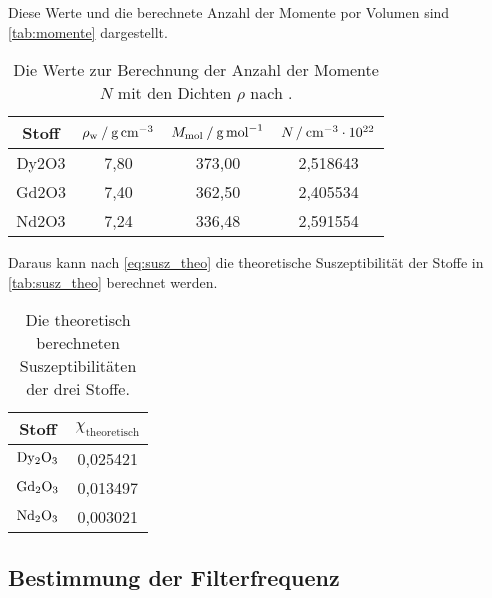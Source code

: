 Diese Werte und die berechnete Anzahl der Momente por Volumen sind \autoref{tab:momente} dargestellt.
\begin{table}
  \centering
  \caption{Die Werte zur Berechnung der Anzahl der Momente $N$ mit den Dichten $\rho$ nach \cite{v606}.}
  \label{tab:momente}
  \begin{tabular}{c c c c}
    \toprule
    Stoff &     
    $\rho_\text{w} \mathbin{/} \unit[per-mode=reciprocal]{\gram\per\cubic\centi\meter}$ & 
    $M_\text{mol} \mathbin{/} \unit[per-mode=reciprocal]{\gram\per\mol}$ & 
    $N \mathbin{/} \unit[per-mode=reciprocal]{\per\cubic\centi\meter} \cdot 10^{22}$ \\ 
    \midrule
    Dy2O3 &         7,80 &       373,00 &            2,518643 \\
    Gd2O3 &         7,40 &       362,50 &            2,405534 \\
    Nd2O3 &         7,24 &       336,48 &            2,591554 \\
    \bottomrule
    \end{tabular}
\end{table}

Daraus kann nach \autoref{eq:susz_theo} die theoretische Suszeptibilität der Stoffe in \autoref{tab:susz_theo} berechnet werden.
\begin{table}
  \centering
  \caption{Die theoretisch berechneten Suszeptibilitäten der drei Stoffe.}
  \label{tab:susz_theo}
  \begin{tabular}{ c c}
    \toprule
    Stoff & 
    $\chi_\text{theoretisch}$ \\
    \midrule
    $\ce{Dy2O3}$ &  0,025421 \\
    $\ce{Gd2O3}$ &  0,013497 \\
    $\ce{Nd2O3}$ &  0,003021 \\
    \bottomrule
  \end{tabular}
\end{table}


\subsection{Bestimmung der Filterfrequenz}

